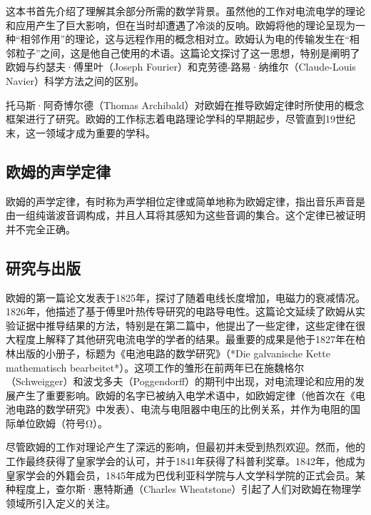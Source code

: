 这本书首先介绍了理解其余部分所需的数学背景。虽然他的工作对电流电学的理论和应用产生了巨大影响，但在当时却遭遇了冷淡的反响。欧姆将他的理论呈现为一种“相邻作用”的理论，这与远程作用的概念相对立。欧姆认为电的传输发生在“相邻粒子”之间，这是他自己使用的术语。这篇论文探讨了这一思想，特别是阐明了欧姆与约瑟夫·傅里叶（Joseph Fourier）和克劳德-路易·纳维尔（Claude-Louis Navier）科学方法之间的区别。

托马斯·阿奇博尔德（Thomas Archibald）对欧姆在推导欧姆定律时所使用的概念框架进行了研究。欧姆的工作标志着电路理论学科的早期起步，尽管直到19世纪末，这一领域才成为重要的学科。
\subsection{欧姆的声学定律}  
欧姆的声学定律，有时称为声学相位定律或简单地称为欧姆定律，指出音乐声音是由一组纯谐波音调构成，并且人耳将其感知为这些音调的集合。这个定律已被证明并不完全正确。
\subsection{研究与出版}  
欧姆的第一篇论文发表于1825年，探讨了随着电线长度增加，电磁力的衰减情况。1826年，他描述了基于傅里叶热传导研究的电路导电性。这篇论文延续了欧姆从实验证据中推导结果的方法，特别是在第二篇中，他提出了一些定律，这些定律在很大程度上解释了其他研究电流电学的学者的结果。最重要的成果是他于1827年在柏林出版的小册子，标题为《电池电路的数学研究》（*Die galvanische Kette mathematisch bearbeitet*）。这项工作的雏形在前两年已在施魏格尔（Schweigger）和波戈多夫（Poggendorff）的期刊中出现，对电流理论和应用的发展产生了重要影响。欧姆的名字已被纳入电学术语中，如欧姆定律（他首次在《电池电路的数学研究》中发表）、电流与电阻器中电压的比例关系，并作为电阻的国际单位欧姆（符号Ω）。

尽管欧姆的工作对理论产生了深远的影响，但最初并未受到热烈欢迎。然而，他的工作最终获得了皇家学会的认可，并于1841年获得了科普利奖章。1842年，他成为皇家学会的外籍会员，1845年成为巴伐利亚科学院与人文学科学院的正式会员。某种程度上，查尔斯·惠特斯通（Charles Wheatstone）引起了人们对欧姆在物理学领域所引入定义的关注。
